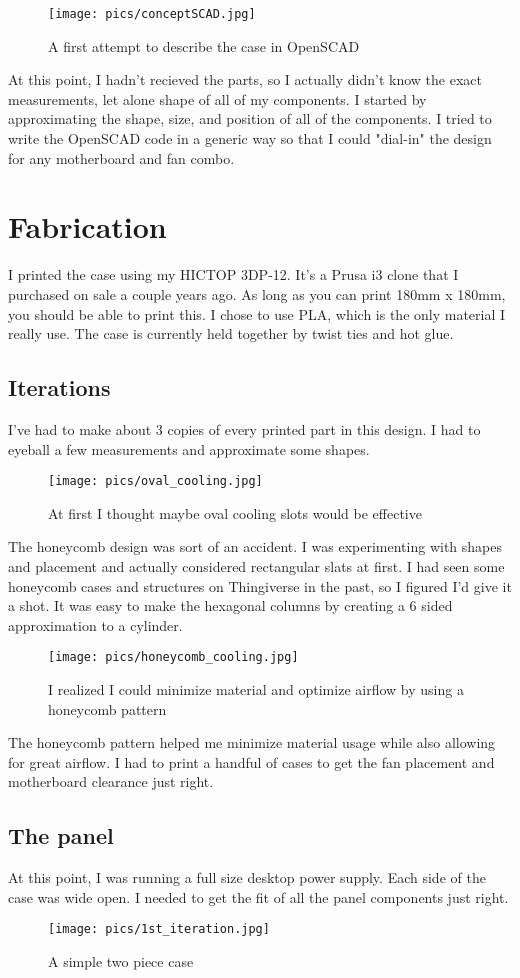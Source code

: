 \documentclass{article}
\begin{document}
\begin{figure}[h]
\texttt{[image: pics/conceptSCAD.jpg]}
\caption{A first attempt to describe the case in OpenSCAD}
\end{figure}
At this point, I hadn't recieved the parts, so I actually didn't know the exact measurements, let alone shape of all of my components. I started by approximating the shape, size, and position of all of the components. I tried to write the OpenSCAD code in a generic way so that I could "dial-in" the design for any motherboard and fan combo.
 
\section{Fabrication}
I printed the case using my HICTOP 3DP-12. It's a Prusa i3 clone that I purchased on sale a couple years ago. As long as you can print 180mm x 180mm, you should be able to print this. I chose to use PLA, which is the only material I really use. The case is currently held together by twist ties and hot glue.
\subsection{Iterations}
I've had to make about 3 copies of every printed part in this design. I had to eyeball a few measurements and approximate some shapes. 
\begin{figure}[h]
\texttt{[image: pics/oval\_cooling.jpg]}
\caption{At first I thought maybe oval cooling slots would be effective}
\end{figure}
The honeycomb design was sort of an accident. I was experimenting with shapes and placement and actually considered rectangular slats at first. I had seen some honeycomb cases and structures on Thingiverse in the past, so I figured I'd give it a shot. It was easy to make the hexagonal columns by creating a 6 sided approximation to a cylinder.

\begin{figure}[h]
\texttt{[image: pics/honeycomb\_cooling.jpg]}
\caption{I realized I could minimize material and optimize airflow by using a honeycomb pattern}
\end{figure}
The honeycomb pattern helped me minimize material usage while also allowing for great airflow. I had to print a handful of cases to get the fan placement and motherboard clearance just right.

\subsection{The panel}
At this point, I was running a full size desktop power supply. Each side of the case was wide open. I needed to get the fit of all the panel components just right.
\begin{figure}[h]
\texttt{[image: pics/1st\_iteration.jpg]}
\caption{A simple two piece case}
\end{figure}
\end{document}
